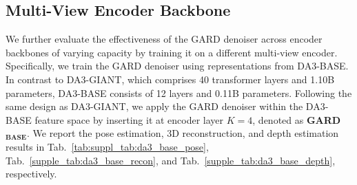 \documentclass{llmxive}
\begin{document}
\subsection{Multi-View Encoder Backbone}
We further evaluate the effectiveness of the GARD denoiser across encoder backbones of varying capacity by training it on a different multi-view encoder. Specifically, we train the GARD denoiser using representations from DA3-BASE. In contrast to DA3-GIANT, which comprises 40 transformer layers and 1.10B parameters, DA3-BASE consists of 12 layers and 0.11B parameters. Following the same design as DA3-GIANT, we apply the GARD denoiser within the DA3-BASE feature space by inserting it at encoder layer $K=4$, denoted as \textbf{GARD}$_{\textbf{BASE}}$. We report the pose estimation, 3D reconstruction, and depth estimation results in Tab.~\ref{tab:suppl_tab:da3_base_pose}, Tab.~\ref{supple_tab:da3_base_recon}, and Tab.~\ref{supple_tab:da3_base_depth}, respectively.
\end{document}
